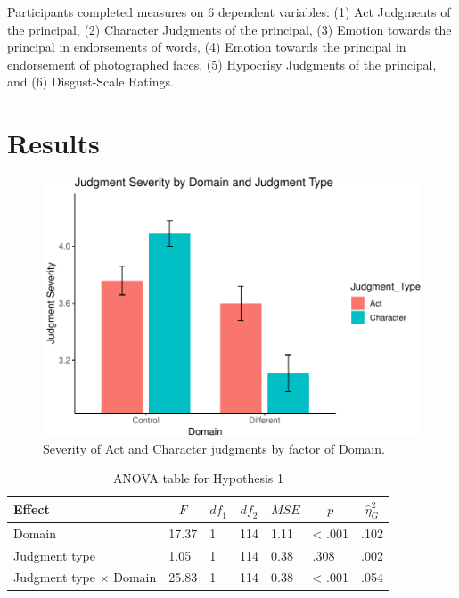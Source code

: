 \documentclass[man]{apa6}
\begin{document}
Participants completed measures on 6 dependent variables: (1) Act
Judgments of the principal, (2) Character Judgments of the principal,
(3) Emotion towards the principal in endorsements of words, (4) Emotion
towards the principal in endorsement of photographed faces, (5)
Hypocrisy Judgments of the principal, and (6) Disgust-Scale Ratings.

\section{Results}\label{results}

\begin{figure}
\centering
\includegraphics{APA_Report_files/figure-latex/unnamed-chunk-2-1.pdf}
\caption{\label{fig:unnamed-chunk-2}Severity of Act and Character judgments
by factor of Domain.}
\end{figure}

\begin{table}[tbp]
\begin{center}
\begin{threeparttable}
\caption{\label{tab:unnamed-chunk-3}ANOVA table for Hypothesis 1}
\begin{tabular}{lllllll}
\toprule
Effect & \multicolumn{1}{c}{$F$} & \multicolumn{1}{c}{$\mathit{df}_1$} & \multicolumn{1}{c}{$\mathit{df}_2$} & \multicolumn{1}{c}{$\mathit{MSE}$} & \multicolumn{1}{c}{$p$} & \multicolumn{1}{c}{$\hat{\eta}^2_G$}\\
\midrule
Domain & 17.37 & 1 & 114 & 1.11 & < .001 & .102\\
Judgment type & 1.05 & 1 & 114 & 0.38 & .308 & .002\\
Judgment type $\times$ Domain & 25.83 & 1 & 114 & 0.38 & < .001 & .054\\
\bottomrule
\end{tabular}
\end{threeparttable}
\end{center}
\end{table}
\end{document}
